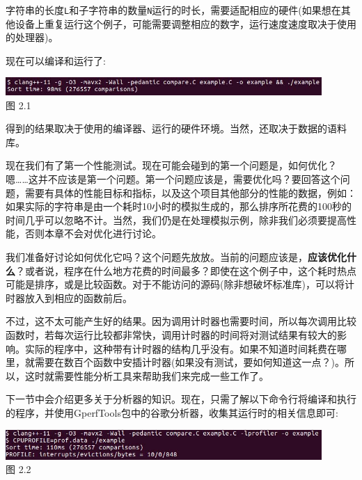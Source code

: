 字符串的长度\texttt{L}和子字符串的数量\texttt{N}运行的时长，需要适配相应的硬件(如果想在其他设备上重复运行这个例子，可能需要调整相应的数字，运行速度速度取决于使用的处理器)。

现在可以编译和运行了:

\begin{center}
\includegraphics[width=0.9\textwidth]{content/1/chapter2/images/1.jpg}\\
图 2.1
\end{center}

得到的结果取决于使用的编译器、运行的硬件环境。当然，还取决于数据的语料库。

现在我们有了第一个性能测试。现在可能会碰到的第一个问题是，如何优化？嗯……这并不应该是第一个问题。第一个问题应该是，需要优化吗？要回答这个问题，需要有具体的性能目标和指标，以及这个项目其他部分的性能的数据，例如：如果实际的字符串是由一个耗时10小时的模拟生成的，那么排序所花费的100秒的时间几乎可以忽略不计。当然，我们仍是在处理模拟示例，除非我们必须要提高性能，否则本章不会对优化进行讨论。

我们准备好讨论如何优化它吗？这个问题先放放。当前的问题应该是，\textbf{应该优化什么}？或者说，程序在什么地方花费的时间最多？即使在这个例子中，这个耗时热点可能是排序，或是比较函数。对于不能访问的源码(除非想破坏标准库)，可以将计时器放入到相应的函数前后。

不过，这不太可能产生好的结果。因为调用计时器也需要时间，所以每次调用比较函数时，若每次运行比较都非常快，调用计时器的时间将对测试结果有较大的影响。实际的程序中，这种带有计时器的结构几乎没有。如果不知道时间耗费在哪里，就需要在数百个函数中安插计时器(如果没有测试，要如何知道这一点？)。所以，这时就需要性能分析工具来帮助我们来完成一些工作了。

下一节中会介绍更多关于分析器的知识。现在，只需了解以下命令行将编译和执行的程序，并使用GperfTools包中的谷歌分析器，收集其运行时的相关信息即可:

\begin{center}
\includegraphics[width=0.9\textwidth]{content/1/chapter2/images/2.jpg}\\
图 2.2
\end{center}

